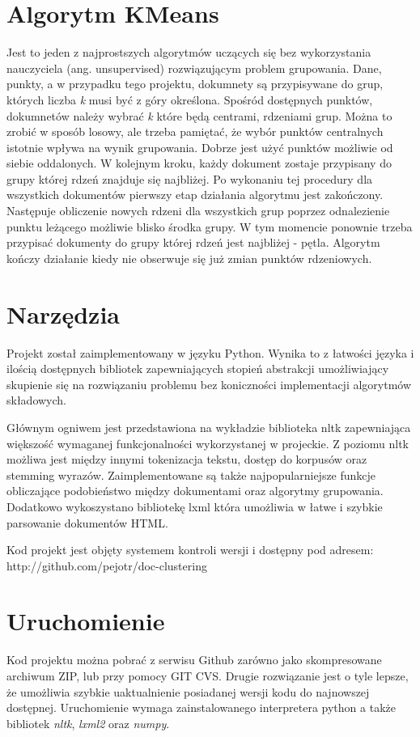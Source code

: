 \documentclass{article}
\begin{document}
\section{Algorytm KMeans}
Jest to jeden z najprostszych algorytmów uczących się bez wykorzystania nauczyciela (ang. unsupervised) rozwiązującym problem grupowania. Dane, punkty, a w przypadku tego projektu, dokumnety są przypisywane do grup, których liczba \emph{k} musi być z góry określona. Spośród dostępnych punktów, dokumnetów należy wybrać \emph{k} które będą centrami, rdzeniami grup. Można to zrobić w sposób losowy, ale trzeba pamiętać, że wybór punktów centralnych istotnie wpływa na wynik grupowania. Dobrze jest użyć punktów możliwie od siebie oddalonych. W kolejnym kroku, każdy dokument zostaje przypisany do grupy której rdzeń znajduje się najbliżej. Po wykonaniu tej procedury dla wszystkich dokumentów pierwszy etap działania algorytmu jest zakończony. Następuje obliczenie nowych rdzeni dla wszystkich grup poprzez odnalezienie punktu leżącego możliwie blisko środka grupy. W tym momencie ponownie trzeba przypisać dokumenty do grupy której rdzeń jest najbliżej - pętla. Algorytm kończy działanie kiedy nie obserwuje się już zmian punktów rdzeniowych.

\section{Narzędzia}
Projekt został zaimplementowany w języku Python. Wynika to z łatwości języka i ilością dostępnych bibliotek zapewniających stopień abstrakcji umożliwiający skupienie się na rozwiązaniu problemu bez koniczności implementacji algorytmów składowych.

Głównym ogniwem jest przedstawiona na wykładzie biblioteka nltk zapewniająca większość wymaganej funkcjonalności wykorzystanej w projeckie. Z poziomu nltk możliwa jest między innymi tokenizacja tekstu, dostęp do korpusów oraz stemming wyrazów. Zaimplementowane są także najpopularniejsze funkcje obliczające podobieństwo między dokumentami oraz algorytmy grupowania. Dodatkowo wykoszystano bibliotekę lxml która umożliwia w łatwe i szybkie parsowanie dokumentów HTML.

Kod projekt jest objęty systemem kontroli wersji i dostępny pod adresem: http://github.com/pejotr/doc-clustering

\section{Uruchomienie}
Kod projektu można pobrać z serwisu Github zarówno jako skompresowane archiwum ZIP, lub przy pomocy GIT CVS. Drugie rozwiązanie jest o tyle lepsze, że umożliwia szybkie uaktualnienie posiadanej wersji kodu do najnowszej dostępnej. Uruchomienie wymaga zainstalowanego interpretera python a także bibliotek \emph{nltk}, \emph{lxml2} oraz \emph{numpy}.
\end{document}
